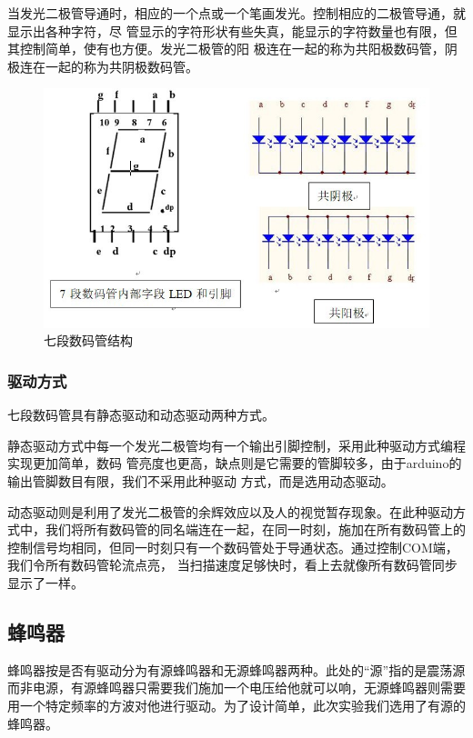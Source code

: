 \documentclass{../source/zjureport}
\begin{document}
            当发光二极管导通时，相应的一个点或一个笔画发光。控制相应的二极管导通，就显示出各种字符，尽
            管显示的字符形状有些失真，能显示的字符数量也有限，但其控制简单，使有也方便。发光二极管的阳
            极连在一起的称为共阳极数码管，阴极连在一起的称为共阴极数码管。
            \newpage
            \begin{figure}[thp]
                \centering
                \includegraphics{figures/七段数码管结构.jpg}
                \caption{七段数码管结构}
            \end{figure}

            \subsubsection{驱动方式}
            七段数码管具有静态驱动和动态驱动两种方式。


            静态驱动方式中每一个发光二极管均有一个输出引脚控制，采用此种驱动方式编程实现更加简单，数码
            管亮度也更高，缺点则是它需要的管脚较多，由于arduino的输出管脚数目有限，我们不采用此种驱动
            方式，而是选用动态驱动。


            动态驱动则是利用了发光二极管的余辉效应以及人的视觉暂存现象。在此种驱动方式中，我们将所有数码管的同名端连在一起，在同一时刻，施加在所有数码管上的控制信号均相同，但同一时刻只有一个数码管处于导通状态。通过控制COM端，我们令所有数码管轮流点亮，	当扫描速度足够快时，看上去就像所有数码管同步显示了一样。

        \subsection{蜂鸣器}
        蜂鸣器按是否有驱动分为有源蜂鸣器和无源蜂鸣器两种。此处的“源”指的是震荡源而非电源，有源蜂鸣器只需要我们施加一个电压给他就可以响，无源蜂鸣器则需要用一个特定频率的方波对他进行驱动。为了设计简单，此次实验我们选用了有源的蜂鸣器。
\end{document}
